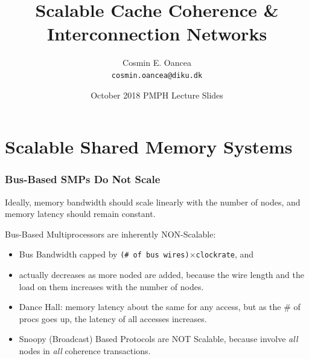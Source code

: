 \documentclass{beamer}
\title[Interconnect]{Scalable Cache Coherence \&\\Interconnection Networks}
\author[C.~Oancea]{Cosmin E. Oancea\\{\tt cosmin.oancea@diku.dk}}
\institute{Department of Computer Science (DIKU)\\University of Copenhagen}
\date[Oct 2018]{October 2018 PMPH Lecture Slides}
\renewcommand{\emph}[1]{\textcolor{structure}{#1}}
\newcommand{\emp}[1]{\textcolor{DikuRed}{ #1}}
\begin{document}
\titleslide




\begin{frame}[fragile]
	\tableofcontents
\end{frame}


\section{Scalable Shared Memory Systems}

\begin{frame}[fragile,t]
\frametitle{Bus-Based SMPs Do Not Scale}

\emph{Ideally, memory bandwidth should scale linearly with the number of nodes,
and memory latency should remain constant}.\bigskip

\alert{Bus-Based Multiprocessors are inherently NON-Scalable}:\medskip
\begin{itemize}
    \item \emp{Bus Bandwidth} capped by {\tt (\# of bus wires)$\times$clockrate}, and
    \item \emp{actually decreases as more noded are added}, 
            because the wire length and the load on them 
            increases with the number of nodes.\bigskip
    \item Dance Hall: memory latency about the same for any access,
            but as the \# of procs goes up, the latency of all
            accesses increases.\bigskip\pause
    \item \emp{Snoopy (Broadcast) Based Protocols are NOT Scalable},
            because involve {\em all} nodes in {\em all} coherence transactions. 
\end  {itemize}
\end{frame}
\end{document}
